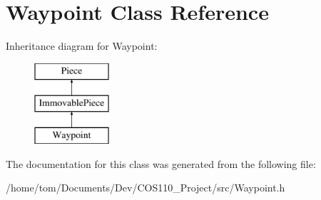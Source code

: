 \hypertarget{classWaypoint}{\section{Waypoint Class Reference}
\label{classWaypoint}
}
Inheritance diagram for Waypoint\-:\begin{figure}[H]
\begin{center}
\leavevmode
\includegraphics[height=3.000000cm]{classWaypoint}
\end{center}
\end{figure}


The documentation for this class was generated from the following file\-:\begin{DoxyCompactItemize}
\item 
/home/tom/\-Documents/\-Dev/\-C\-O\-S110\-\_\-\-Project/src/Waypoint.\-h\end{DoxyCompactItemize}
